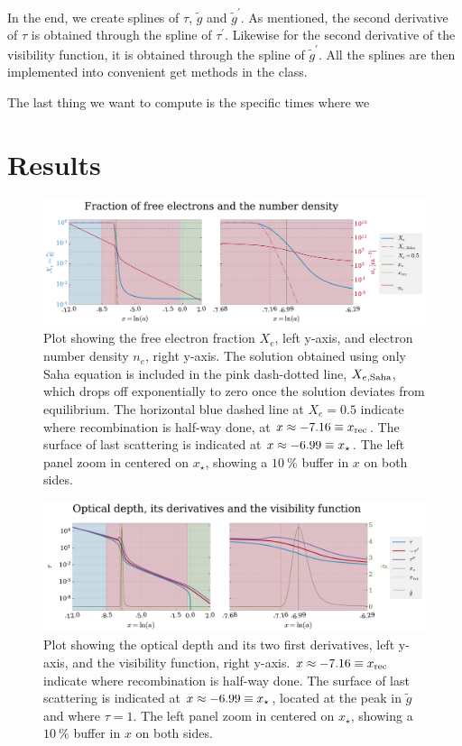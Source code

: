 \documentclass[10pt,a4paper]{article}
\begin{document}
In the end, we create splines of $\tau$, $\tilde{g}$ and $\tilde{g}^\prime$. As mentioned, the second derivative of $\tau$ is obtained through the spline of $\tau^\prime$. Likewise for the second derivative of the visibility function, it is obtained through the spline of $\tilde{g}^\prime$. All the splines are then implemented into convenient get methods in the class.

The last thing we want to compute is the specific times where we 

\section{Results}
\label{sec:Results}


\begin{figure}[ht]
    \centering
    \includegraphics[scale=0.5]{../figs/free_electrons.pdf}
    \caption{Plot showing the free electron fraction $X_e$, left y-axis, and electron number density $n_e$, right y-axis. The solution obtained using only Saha equation is included in the pink dash-dotted line, $X_{e,\rm{Saha}}$, which drops off exponentially to zero once the solution deviates from equilibrium. The horizontal blue dashed line at $X_e=0.5$ indicate where recombination is half-way done, at $x\approx-7.16\equiv x_{\rm{rec}}$. The surface of last scattering is indicated at $x\approx-6.99\equiv x_{\rm{\star}}$. The left panel zoom in centered on $x_{\star}$, showing a $\SI{10}{\%}$ buffer in $x$ on both sides.}
    \label{fig:Xe and ne}
\end{figure}

\begin{figure}[ht]
    \centering
    \includegraphics[scale=0.5]{../figs/optical_depth.pdf}
    \caption{Plot showing the optical depth and its two first derivatives, left y-axis, and the visibility function, right y-axis. $x\approx-7.16\equiv x_{\rm{rec}}$ indicate where recombination is half-way done. The surface of last scattering is indicated at $x\approx-6.99\equiv x_{\rm{\star}}$, located at the peak in $\tilde{g}$ and where $\tau=1$. The left panel zoom in centered on $x_{\star}$, showing a $\SI{10}{\%}$ buffer in $x$ on both sides.}
    \label{fig:tau}
\end{figure}
\end{document}

